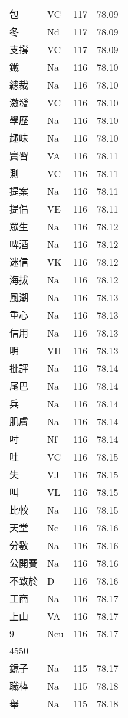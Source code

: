 \documentclass[twocolumn]{book}
\begin{document}
\begin{supertabular}{llrr}
包 & VC & 117 &  78.09\\
冬 & Nd & 117 &  78.09\\
支撐 & VC & 117 &  78.09\\
鐵 & Na & 116 &  78.10\\
總裁 & Na & 116 &  78.10\\
激發 & VC & 116 &  78.10\\
學歷 & Na & 116 &  78.10\\
趣味 & Na & 116 &  78.10\\
實習 & VA & 116 &  78.11\\
測 & VC & 116 &  78.11\\
提案 & Na & 116 &  78.11\\
提倡 & VE & 116 &  78.11\\
眾生 & Na & 116 &  78.12\\
啤酒 & Na & 116 &  78.12\\
迷信 & VK & 116 &  78.12\\
海拔 & Na & 116 &  78.12\\
風潮 & Na & 116 &  78.13\\
重心 & Na & 116 &  78.13\\
信用 & Na & 116 &  78.13\\
明 & VH & 116 &  78.13\\
批評 & Na & 116 &  78.14\\
尾巴 & Na & 116 &  78.14\\
兵 & Na & 116 &  78.14\\
肌膚 & Na & 116 &  78.14\\
吋 & Nf & 116 &  78.14\\
吐 & VC & 116 &  78.15\\
失 & VJ & 116 &  78.15\\
叫 & VL & 116 &  78.15\\
比較 & Na & 116 &  78.15\\
天堂 & Nc & 116 &  78.16\\
分數 & Na & 116 &  78.16\\
公開賽 & Na & 116 &  78.16\\
不致於 & D & 116 &  78.16\\
工商 & Na & 116 &  78.17\\
上山 & VA & 116 &  78.17\\
9 & Neu & 116 &  78.17\\
4550\\
鏡子 & Na & 115 &  78.17\\
職棒 & Na & 115 &  78.18\\
舉 & Na & 115 &  78.18\\

\end{supertabular}
\end{document}
